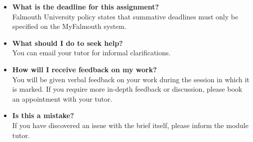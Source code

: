 \documentclass{../../fal_assignment}
\begin{document}
\begin{itemize}
	\item 	\textbf{What is the deadline for this assignment?} \\ 
    		Falmouth University policy states that summative deadlines must only be specified on the MyFalmouth system.
    		
	\item 	\textbf{What should I do to seek help?} \\ 
    		You can email your tutor for informal clarifications.  
    		
	\item 	\textbf{How will I receive feedback on my work?} \\ 
    		You will be given verbal feedback on your work during the session in which it is marked.
    		If you require more in-depth feedback or discussion, please book an appointment with your tutor.
    		
    	\item 	\textbf{Is this a mistake?} \\ 	
    		If you have discovered an issue with the brief itself, please inform the module tutor.
    		
\end{itemize}
\end{document}

